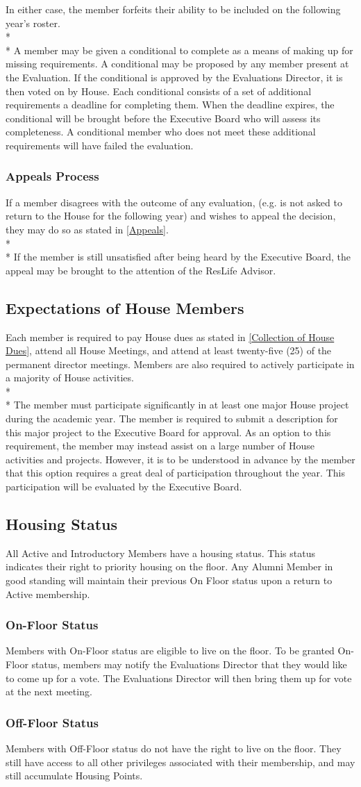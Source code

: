 \documentclass{article}
\newcommand{\bsection}[1]{\subsection{#1} \label{#1}}
\newcommand{\bsubsection}[1]{\subsubsection{#1} \label{#1}}
\begin{document}
In either case, the member forfeits their ability to be included on the following year’s roster.
\\* \\*
A member may be given a conditional to complete as a means of making up for missing requirements.
A conditional may be proposed by any member present at the Evaluation. If the conditional is approved by the Evaluations Director, it is then voted on by House.
Each conditional consists of a set of additional requirements a deadline for completing them.
When the deadline expires, the conditional will be brought before the Executive Board who will assess its completeness.
A conditional member who does not meet these additional requirements will have failed the evaluation.
\bsubsection{Appeals Process}
If a member disagrees with the outcome of any evaluation, (e.g. is not asked to return to the House for the following year) and wishes to appeal the decision, they may do so as stated in \ref{Appeals}.
\\* \\*
If the member is still unsatisfied after being heard by the Executive Board, the appeal may be brought to the attention of the ResLife Advisor.

\bsection{Expectations of House Members}
Each member is required to pay House dues as stated in \ref{Collection of House Dues}, attend all House Meetings, and attend at least twenty-five (25) of the permanent director meetings.
Members are also required to actively participate in a majority of House activities.
\\* \\*
The member must participate significantly in at least one major House project during the academic year.
The member is required to submit a description for this major project to the Executive Board for approval.
As an option to this requirement, the member may instead assist on a large number of House activities and projects.
However, it is to be understood in advance by the member that this option requires a great deal of participation throughout the year.
This participation will be evaluated by the Executive Board.

\bsection{Housing Status}
All Active and Introductory Members have a housing status.
This status indicates their right to priority housing on the floor.
Any Alumni Member in good standing will maintain their previous On Floor status upon a return to Active membership.
\bsubsection{On-Floor Status}
Members with On-Floor status are eligible to live on the floor.
To be granted On-Floor status, members may notify the Evaluations Director that they would like to come up for a vote.
The Evaluations Director will then bring them up for vote at the next meeting.
\bsubsection{Off-Floor Status}
Members with Off-Floor status do not have the right to live on the floor.
They still have access to all other privileges associated with their membership, and may still accumulate Housing Points.
\end{document}
